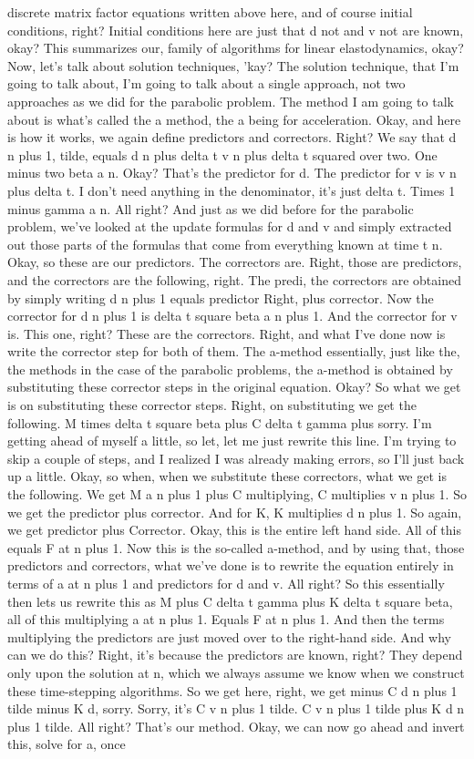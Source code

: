 \documentclass[10pt]{article}
\begin{document}
discrete matrix factor equations written above here, and of course initial conditions, right? Initial conditions here are just that d not and v not are known, okay? This summarizes our, family of algorithms for linear elastodynamics, okay? Now, let's talk about solution techniques, 'kay? The solution technique, that I'm going to talk about, I'm going to talk about a single approach, not two approaches as we did for the parabolic problem. The method I am going to talk about is what's called the a method, the a being for acceleration. Okay, and here is how it works, we again define predictors and correctors. Right? We say that d n plus 1, tilde, equals d n plus delta t v n plus delta t squared over two. One minus two beta a n. Okay? That's the predictor for d. The predictor for v is v n plus delta t. I don't need anything in the denominator, it's just delta t. Times 1 minus gamma a n. All right? And just as we did before for the parabolic problem, we've looked at the update formulas for d and v and simply extracted out those parts of the formulas that come from everything known at time t n. Okay, so these are our predictors. The correctors are. Right, those are predictors, and the correctors are the following, right. The predi, the correctors are obtained by simply writing d n plus 1 equals predictor Right, plus corrector. Now the corrector for d n plus 1 is delta t square beta a n plus 1. And the corrector for v is. This one, right? These are the correctors. Right, and what I've done now is write the corrector step for both of them. The a-method essentially, just like the, the methods in the case of the parabolic problems, the a-method is obtained by substituting these corrector steps in the original equation. Okay? So what we get is on substituting these corrector steps. Right, on substituting we get the following. M times delta t square beta plus C delta t gamma plus sorry. I'm getting ahead of myself a little, so let, let me just rewrite this line. I'm trying to skip a couple of steps, and I realized I was already making errors, so I'll just back up a little. Okay, so when, when we substitute these correctors, what we get is the following. We get M a n plus 1 plus C multiplying, C multiplies v n plus 1. So we get the predictor plus corrector. And for K, K multiplies d n plus 1. So again, we get predictor plus Corrector. Okay, this is the entire left hand side. All of this equals F at n plus 1. Now this is the so-called a-method, and by using that, those predictors and correctors, what we've done is to rewrite the equation entirely in terms of a at n plus 1 and predictors for d and v. All right? So this essentially then lets us rewrite this as M plus C delta t gamma plus K delta t square beta, all of this multiplying a at n plus 1. Equals F at n plus 1. And then the terms multiplying the predictors are just moved over to the right-hand side. And why can we do this? Right, it's because the predictors are known, right? They depend only upon the solution at n, which we always assume we know when we construct these time-stepping algorithms. So we get here, right, we get minus C d n plus 1 tilde minus K d, sorry. Sorry, it's C v n plus 1 tilde. C v n plus 1 tilde plus K d n plus 1 tilde. All right? That's our method. Okay, we can now go ahead and invert this, solve for a, once 
\end{document}
